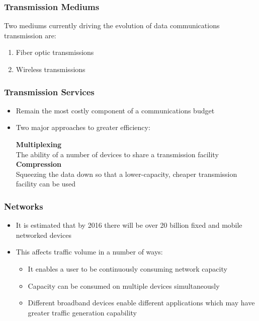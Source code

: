 \documentclass[pdflatex,compress]{beamer}
\begin{document}
\begin{frame}
	\frametitle{Transmission Mediums}
	Two mediums currently driving the evolution of data communications transmission are:
	\begin{enumerate}
		\item Fiber optic transmissions
		\item Wireless transmissions
	\end{enumerate}
\end{frame}

\begin{frame}
	\frametitle{Transmission Services}
	\begin{itemize}
		\item Remain the most costly component of a communications budget
		\item Two major approaches to greater efficiency:
		\begin{multicols}{2}
			\centering \textbf{Multiplexing}\\
			\centering The ability of a number of devices to share a transmission facility\\
			\columnbreak
			\centering \textbf{Compression}\\
			\centering Squeezing the data down so that a lower-capacity, cheaper transmission facility can be used
		\end{multicols}
	\end{itemize}
\end{frame}

\begin{frame}
	\frametitle{Networks}
	\begin{itemize}
		\item It is estimated that by 2016 there will be over 20 billion fixed and mobile networked devices
		\item This affects traffic volume in a number of ways:
		\begin{itemize}
			\item It enables a user to be continuously consuming network capacity
			\item Capacity can be consumed on multiple devices simultaneously
			\item Different broadband devices enable different applications which may have greater traffic generation capability
		\end{itemize}
	\end{itemize}
\end{frame}
\end{document}
